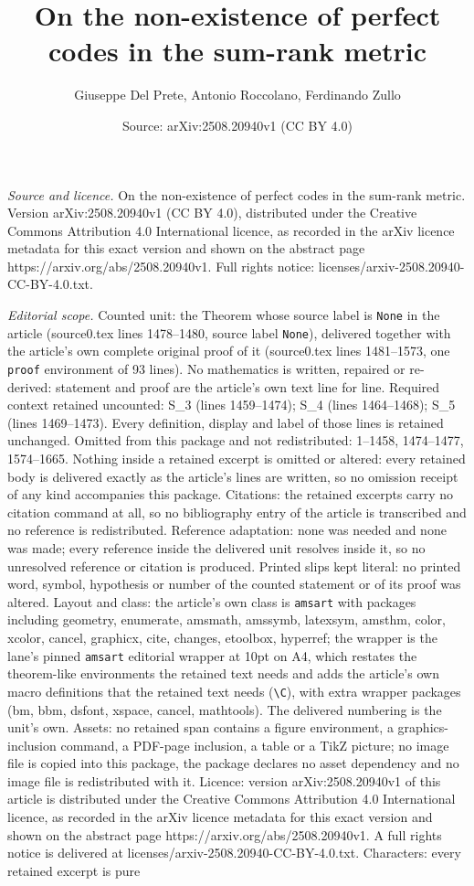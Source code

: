 \documentclass[10pt,a4paper]{amsart}
\title[On the non-existence of perfect codes in the sum-rank metric]{On the non-existence of perfect codes in the sum-rank metric}
\author{Giuseppe Del Prete, Antonio Roccolano, Ferdinando Zullo}
\date{Source: arXiv:2508.20940v1 (CC BY 4.0)}
\begin{document}
\maketitle

\noindent\emph{Source and licence.} On the non-existence of perfect codes in the sum-rank metric. Version arXiv:2508.20940v1 (CC BY 4.0), distributed under the Creative Commons Attribution 4.0 International licence, as recorded in the arXiv licence metadata for this exact version and shown on the abstract page https://arxiv.org/abs/2508.20940v1. Full rights notice: licenses/arxiv-2508.20940-CC-BY-4.0.txt.\par\smallskip

\noindent\textit{Editorial scope.} Counted unit: the Theorem whose source label is \texttt{None} in the article (source0.tex lines 1478--1480, source label \texttt{None}), delivered together with the article's own complete original proof of it (source0.tex lines 1481--1573, one \texttt{proof} environment of 93 lines). No mathematics is written, repaired or re-derived: statement and proof are the article's own text line for line. Required context retained uncounted: S\_3 (lines 1459--1474); S\_4 (lines 1464--1468); S\_5 (lines 1469--1473). Every definition, display and label of those lines is retained unchanged. Omitted from this package and not redistributed: 1--1458, 1474--1477, 1574--1665. Nothing inside a retained excerpt is omitted or altered: every retained body is delivered exactly as the article's lines are written, so no omission receipt of any kind accompanies this package. Citations: the retained excerpts carry no citation command at all, so no bibliography entry of the article is transcribed and no reference is redistributed. Reference adaptation: none was needed and none was made; every reference inside the delivered unit resolves inside it, so no unresolved reference or citation is produced. Printed slips kept literal: no printed word, symbol, hypothesis or number of the counted statement or of its proof was altered. Layout and class: the article's own class is \texttt{amsart} with packages including geometry, enumerate, amsmath, amssymb, latexsym, amsthm, color, xcolor, cancel, graphicx, cite, changes, etoolbox, hyperref; the wrapper is the lane's pinned \texttt{amsart} editorial wrapper at 10pt on A4, which restates the theorem-like environments the retained text needs and adds the article's own macro definitions that the retained text needs (\texttt{\textbackslash C}), with extra wrapper packages (bm, bbm, dsfont, xspace, cancel, mathtools). The delivered numbering is the unit's own. Assets: no retained span contains a figure environment, a graphics-inclusion command, a PDF-page inclusion, a table or a TikZ picture; no image file is copied into this package, the package declares no asset dependency and no image file is redistributed with it. Licence: version arXiv:2508.20940v1 of this article is distributed under the Creative Commons Attribution 4.0 International licence, as recorded in the arXiv licence metadata for this exact version and shown on the abstract page https://arxiv.org/abs/2508.20940v1. A full rights notice is delivered at licenses/arxiv-2508.20940-CC-BY-4.0.txt. Characters: every retained excerpt is pure 
\end{document}
